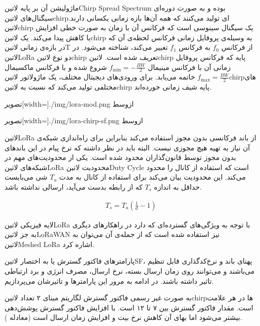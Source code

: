 ماژولیشن آن بر پایه ‌لاتین{Chirp Spread Spectrum} بوده و به صورت دوره‌ای سیگنال‌های ‌لاتین{chirp}ای تولید می‌کنند که همه آن‌ها بازه زمانی یکسانی دارند.
‌لاتین{chirp} یک سیگنال سینوسی است که فرکانس آن با زمان به صورت خطی افزایش یا کاهش پیدا می‌کند.
یک ‌لاتین{chirp} به وسیله‌ی پروفایل زمانی فرکانس لحظه‌ی آن که در بازه‌ی زمانی ‌لاتین{T} از فرکانس $f_0$ به فرکانس $f_1$
تغییر می‌کند، شناخته می‌شود.
در ‌لاتین{LoRa} دو نوع ‌لاتین{chirp} تعریف شده است. ‌لاتین{chirp} پایه که فرکانس پروفایل زمانی آن با فرکانس مینیمال
\(f_{\min} = -\frac{BW}{2}\)
شروع شده و با فرکانس ماکسیمال
\(f_{\max} = \frac{BW}{2}\)
خاتمه می‌یابد.
برای ورودی‌های دیجیتال مختلف، یک ماژولاتور ‌لاتین{chirp}های مختلفی تولید می‌کند که نسبت به ‌لاتین{chirp} پایه شیف زمانی خورده‌اند.

‌تصویر[width=\textwidth]{./img/lora-mod.png}
‌ازوسط

‌تصویر[width=\textwidth]{./img/lora-chirp-sf.png}
‌ازوسط

‌لاتین{LoRa} از باند فرکانسی بدون مجوز استفاده می‌کند بنابراین برای راه‌اندازی شبکه‌ی آن نیاز به تهیه هیچ مجوزی نیست. البته باید در نظر داشته که نرخ پیام در این باندهای بدون مجوز توسط قانون‌گذاران محدود شده است.
یکی از محدودیت‌های مهم در شبکه‌های ‌لاتین{LoRa} محدودیت ‌لاتین{Duty Cycle} است که استفاده از کانال را محدود می‌کند. این محدودیت بیان می‌کند برای استفاده از کانال به مدت $T_{a}$ شی می‌بایست
حداقل به اندازه $T_{s}$ که از رابطه  بدست می‌آید، ارسالی نداشته باشد.

\begin{align}
  \label{معادله: چرخه وظیفه}
  T_{s} = T_{a}\left( \frac{1}{d} - 1 \right)
\end{align}

لایه فیزیکی ‌لاتین{LoRa} با توجه به ویژگی‌های گسترده‌ای که دارد در راهکارهای دیگری به جز ‌لاتین{LoRaWAN} نیز استفاده شده است که از جمله‌ی آن می‌توان به ‌لاتین{Meshed LoRa} اشاره کرد.

پارامترهای فاکتور گسترش یا به اختصار ‌لاتین{SF}، پهنای باند و نرخ‌کدگذاری قابل تنظیم می‌باشند و می‌توانند روی زمان ارسال بسته، نرخ ارسال، مصرف انرژی و برد ارتباطی تاثیر داشته باشند.
در ادامه به مرور این پارامترها و تاثیرشان می‌پردازیم.

به صورت غیر رسمی فاکتور گسترش لگاریتم مبنای ۲ تعداد ‌لاتین{chirp}ها در هر علامت است. مقدار فاکتور گسترش بین ۷ تا ۱۲ است.
با افزایش فاکتور گسترش پوشش‌دهی بیشتر می‌شود اما بهای آن کاهش نرخ بیت و افزایش زمان ارسال است (معادله ).

